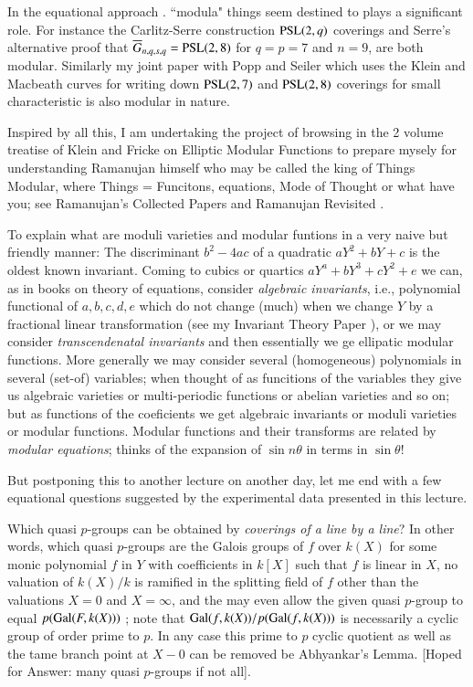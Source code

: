 In the equational approach . ``modula" things seem destined to plays a significant role. For instance the Carlitz-Serre construction $\operatorname{PSL}(2,q)$ coverings and Serre's alternative proof \cite{art1-key57} that $\overline{G}_{n,q,s,q} = \operatorname{PSL}(2,8)$ for $q=p=7$ and $n=9$, are both modular. Similarly my joint paper \cite{art1-key16} with Popp and Seiler which uses the Klein and Macbeath curves for writing down $\operatorname{PSL} (2,7)$ and $\operatorname{PSL} (2,8)$  coverings for small characteristic is also modular in nature. 

Inspired by all this, I am undertaking the project of browsing in the 2 volume treatise of Klein and Fricke \cite{art1-key43} on Elliptic Modular Functions to prepare mysely for understanding Ramanujan himself who may be called the king of Things Modular, where Things = Funcitons, equations, Mode of Thought or what have you; see Ramanujan's Collected Papers \cite{art1-key50} and Ramanujan Revisited \cite{art1-key15}. 

To explain what are moduli varieties and modular funtions in a very naive but friendly manner: The discriminant $b^{2}-4ac$ of a quadratic $aY^{2}+bY+c$ is the oldest known invariant. Coming to cubics or quartics $aY^{a} + bY^{3} +cY^{2} +e$ we can, as in books on theory of equations, consider \textit{algebraic invariants}, i.e., polynomial functional of $a,b,c,d,e$ which do not change (much) when we change $Y$ by a fractional linear transformation (see my Invariant Theory Paper \cite{art1-key13}), or we may consider \textit{transcendenatal invariants} and then essentially we ge ellipatic modular functions. More generally we may consider several (homogeneous) polynomials in several (set-of) variables; when thought of as funcitions of the variables they give us algebraic varieties or multi-periodic functions or abelian varieties and so on; but as functions of the coeficients we get algebraic invariants or moduli varieties or modular functions. Modular functions and their transforms are related by \textit{modular equations}; thinks of the expansion of $\sin n\theta$ in terms in $\sin \theta$!

But postponing this to another lecture on another day, let me end with a few equational questions suggested by the experimental data presented in this lecture.
\begin{question}\label{art1-qus9.1}
Which quasi $p$-groups can be obtained by \textit{coverings of a line by a line}? In other words, which quasi $p$-groups are the Galois groups of $f$ over $k(X)$ for some monic polynomial $f$ in $Y$ with coefficients in $k[X]$ such that $f$ is linear in $X$, no valuation of $k(X)/k$ is ramified in the splitting field of $f$ other than the valuations $X=0$ and $X=\infty$, and the may even allow the given quasi $p$-group to equal $p(\operatorname{Gal}(F, k(X)))$ ; note that $\operatorname{Gal}(f, k(X))/p(\operatorname{Gal}(f,k(X)))$ is necessarily a cyclic group of order prime to $p$. In any case this prime to $p$ cyclic quotient as well as the tame branch point at $X-0$ can be removed be Abhyankar's Lemma. [Hoped for Answer: many quasi $p$-groups if not all].
\end{question}

